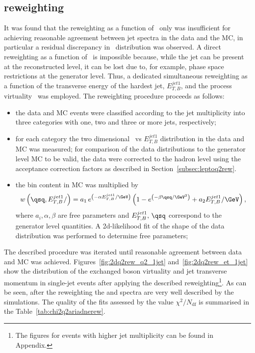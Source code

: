 \subsection{\ariadne reweighting}
\label{subsec:ariadneq2rew}
It was found that the reweighting as a function of \qsq~only was insufficient for achieving reasonable agreement between jet spectra in the data and the \ariadne MC, in particular a residual discrepancy in \etjetb~distribution was observed. A direct reweighting as a function of \etjetb~is impossible because, while the jet can be present at the reconstructed level, it can be lost due to, for example, phase space restrictions at the generator level. Thus, a dedicated simultaneous reweighting as a function of the transverse energy of the hardest jet, $E_{T,B}^{jet1}$, and the process virtuality \qsq~was employed. The reweighting procedure proceeds as follows:
\begin{itemize}
	\item the data and MC events were classified according to the jet multiplicity into three categories with one, two and three or more jets, respectively;
	\item for each category the two dimensional \qsq~vs $E_{T,B}^{jet1}$ distribution in the data and MC was measured; for comparison of the data distributions to the generator level MC to be valid, the data were corrected to the hadron level using the acceptance correction factors as described in Section~\ref{subsec:leptoq2rew}.
	\item the bin content in MC was multiplied by 
	\begin{equation}
		w\left( \qsq, E_{T,B}^{jet1}/ \right)=a_1\,e^{\left( -\alpha E_{T,B}^{jet1}/\GeV\right) }\left(1- e^{\left( -\beta\qsq/\GeV^2\right) } + a_2 E_{T,B}^{jet1}/\GeV \right),
		\end{equation}
where $a_i, \alpha, \beta$ are free parameters and $E_{T,B}^{jet1},\,\qsq$ correspond to the generator level quantities. A 2d-likelihood fit of the shape of the data distribution was performed to determine free parameters;
\end{itemize}
The described procedure was iterated until reasonable agreement between data and MC was achieved. Figures~\ref{fig:2dq2rew_q2_1jet} and~\ref{fig:2dq2rew_et_1jet} show the distribution of the exchanged boson virtuality and jet transverse momentum in single-jet events after applying the described reweighting\footnote{The figures for events with higher jet multiplicity can be found in Appendix.}. As can be seen, after the reweighting the \qsq and \etjetb spectra are very well described by the simulations. The quality of the fits assessed by the value  $\chi^2/N_\text{df}$ is summarised in the Table~\ref{tab:chi2q2ariadnerew}.
